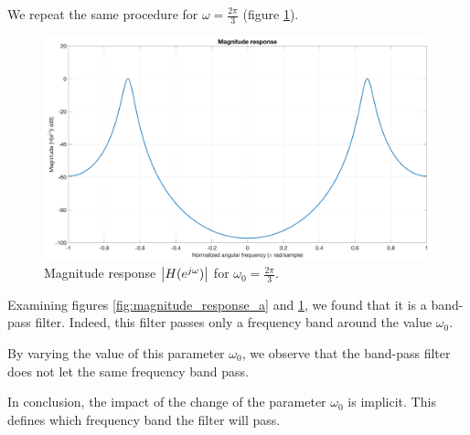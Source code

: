 \documentclass[a4paper, 12pt]{article}
\begin{document}
	We repeat the same procedure for $\omega = \frac{2\pi}{3}$ (figure \ref{fig:magnitude_response_b}).\par
	\begin{figure}[!ht]
	    \centering
	    \includegraphics[width=1\textwidth]{resources/pdf/magnitude_response_b.pdf}
	    \caption{Magnitude response $\left|H(e^{j\omega})\right|$ for $\omega_0 = \frac{2\pi}{3}$.}
	    \label{fig:magnitude_response_b}
	\end{figure}
	Examining figures \ref{fig:magnitude_response_a} and \ref{fig:magnitude_response_b}, we found that it is a band-pass filter. Indeed, this filter passes only a frequency band around the value $\omega_0$.\par
	By varying the value of this parameter $\omega_0$, we observe that the band-pass filter does not let the same frequency band pass.\par
	In conclusion, the impact of the change of the parameter $\omega_0$ is implicit. This defines which frequency band the filter will pass.
	\newpage
\end{document}
